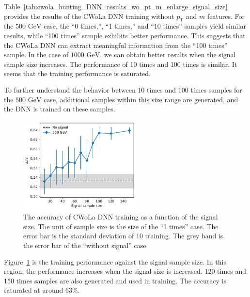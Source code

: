 \documentclass[12pt]{article}
\begin{document}
		Table~\ref{tab:cwola_hunting_DNN_results_wo_pt_m_enlarge_signal_size} provides the results of the CWoLa DNN training without $p_{\text{T}}$ and $m$ features. For the $\text{500 GeV}$ case, the ``0 times,'', ``1 times,'' and ``10 times'' samples yield similar results, while ``100 times'' sample exhibits better performance. This suggests that the CWoLa DNN can extract meaningful information from the ``100 times'' sample. In the case of $\text{1000 GeV}$, we can obtain better results when the signal sample size increases. The performance of 10 times and 100 times is similar. It seems that the training performance is saturated. 

		To further understand the behavior between 10 times and 100 times samples for the $\text{500 GeV}$ case, additional samples within this size range are generated, and the DNN is trained on these samples.

		\begin{figure}[htpb]
			\centering
			\includegraphics[width=0.55\textwidth]{ACC_vs_signal_sample_size-500GeV.pdf}
			\caption{The accuracy of CWoLa DNN training as a function of the signal size. The unit of sample size is the size of the ``1 times'' case. The error bar is the standard deviation of 10 training. The grey band is the error bar of the ``without signal'' case.}
			\label{fig:cwola_hunting_DNN_results_wo_pt_m_various_signal_size_500GeV}
		\end{figure}

		Figure~\ref{fig:cwola_hunting_DNN_results_wo_pt_m_various_signal_size_500GeV} is the training performance against the signal sample size. In this region, the performance increases when the signal size is increased. 120 times and 150 times samples are also generated and used in training. The accuracy is saturated at around 63\%.
\end{document}
